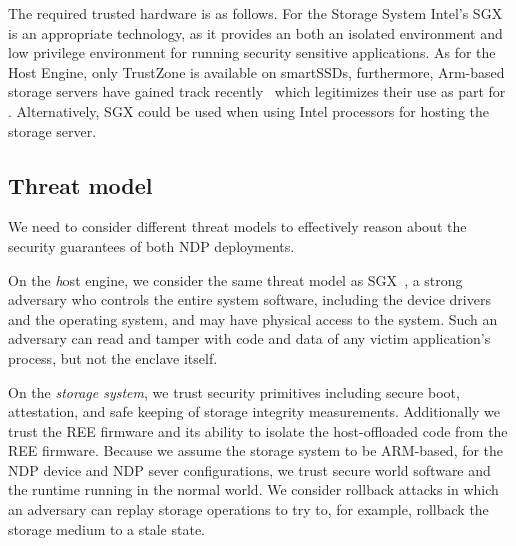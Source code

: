 The required trusted hardware is as follows.
For the Storage System Intel's SGX is an appropriate technology, as it provides an both an isolated environment and low privilege environment for running security sensitive applications.
As for the Host Engine, only TrustZone is available on smartSSDs, furthermore, Arm-based storage servers have gained track recently~\cite{} which legitimizes their use as part for \project{}. Alternatively, SGX could be used when using Intel processors for hosting the storage server.
\fi




\subsection{Threat model}
\label{overview:threat-model}
We need to consider different threat models to effectively reason about the security guarantees of both NDP deployments. 

On the {\emph host engine}, we consider the same threat model as SGX~\cite{baumann2014}, a strong adversary who controls the entire system software, including the device drivers and the operating system, and may have physical access to the system.
Such an adversary can read and tamper with code and data of any victim application's process, but not the enclave itself. 

\noindent On the \emph{storage system}, we trust security primitives including secure boot, attestation, and safe keeping of storage integrity measurements. Additionally we trust the REE firmware and its ability to isolate the host-offloaded code from the REE firmware.
Because we assume the storage system to be ARM-based, for the NDP device and NDP sever configurations, we trust secure world software and the runtime running in the normal world.
We consider rollback attacks in which an adversary can replay storage operations to try to, for example, rollback the storage medium to a stale state.

